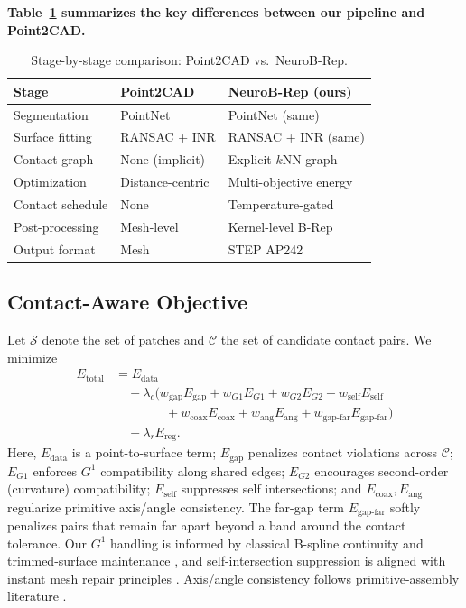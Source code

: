 \documentclass{ieeeaccess}
\providecommand{\DIFaddtex}[1]{{\color{blue}\bfseries #1}} %
\providecommand{\DIFaddend}{} %
\providecommand{\DIFadd}[1]{\texorpdfstring{\DIFaddtex{#1}}{#1}} %
\begin{document}
\DIFadd{Table~\ref{tab:pipeline_comparison} summarizes the key differences between our pipeline and Point2CAD.
}

\begin{table}[t]
  \caption{Stage-by-stage comparison: Point2CAD vs.\ NeuroB-Rep.}
  \label{tab:pipeline_comparison}
  \centering
  \footnotesize
  \setlength{\tabcolsep}{3pt}
  \begin{tabular}{l l l}
    \toprule
    \textbf{Stage} & \textbf{Point2CAD} & \textbf{NeuroB-Rep (ours)} \\
    \midrule
    Segmentation & PointNet & PointNet (same) \\
    Surface fitting & RANSAC + INR & RANSAC + INR (same) \\
    Contact graph & None (implicit) & Explicit $k$NN graph \\
    Optimization & Distance-centric & Multi-objective energy \\
    Contact schedule & None & Temperature-gated \\
    Post-processing & Mesh-level & Kernel-level B-Rep \\
    Output format & Mesh & STEP AP242 \\
    \bottomrule
  \end{tabular}
\end{table}


\DIFaddend \subsection{Contact-Aware Objective}
Let $\mathcal{S}$ denote the set of patches and $\mathcal{C}$ the set of candidate contact pairs. We minimize
\begin{equation}
\begin{split}
\label{eq:energy}
E_{\text{total}}
&= E_{\text{data}} \\
&\quad + \lambda_c \big(
    w_{\text{gap}} E_{\text{gap}}
  + w_{G1} E_{G1}
  + w_{G2} E_{G2}
  + w_{\text{self}} E_{\text{self}} \\
&\qquad\qquad
  + w_{\text{coax}} E_{\text{coax}}
  + w_{\text{ang}} E_{\text{ang}}
  + w_{\text{gap-far}} E_{\text{gap-far}}
  \big) \\
&\quad + \lambda_r E_{\text{reg}} .
\end{split}
\end{equation}
Here, $E_{\text{data}}$ is a point-to-surface term; $E_{\text{gap}}$ penalizes contact violations across $\mathcal{C}$; $E_{G1}$ enforces $G^1$ compatibility along shared edges; $E_{G2}$ encourages second-order (curvature) compatibility; $E_{\text{self}}$ suppresses self intersections; and $E_{\text{coax}}, E_{\text{ang}}$ regularize primitive axis/angle consistency. The far-gap term $E_{\text{gap-far}}$ softly penalizes pairs that remain far apart beyond a band around the contact tolerance. Our $G^1$ handling is informed by classical B-spline continuity and trimmed-surface maintenance \cite{b10,b11,b22}, and self-intersection suppression is aligned with instant mesh repair principles \cite{b12}. Axis/angle consistency follows primitive-assembly literature \cite{b14}.
\end{document}
